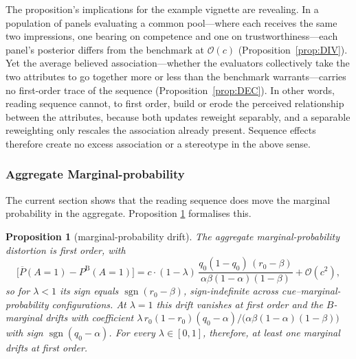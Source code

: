 \documentclass[a4paper,fleqn]{cas-sc}
\newtheorem{proposition}{Proposition}
\theoremstyle{remark}
\theoremstyle{definition}
\newcommand{\PB}{P^{\mathrm{B}}}
\newcommand{\Pbar}{\overline{P}}
\newcommand{\sgn}{\operatorname{sgn}}
\newcommand{\bigO}{\mathcal{O}}
\newcommand{\anchor}[1]{}
\begin{document}
The proposition's implications for the example vignette are revealing. In a population of panels evaluating a common pool---where each receives the same two impressions, one bearing on competence and one on trustworthiness---each panel's posterior differs from the benchmark at $\bigO(c)$
(Proposition~\ref{prop:DIV}). Yet the average believed association---whether the evaluators
collectively take the two attributes to go together more or less than the benchmark
warrants---carries no first-order trace of the sequence (Proposition~\ref{prop:DEC}). In other words, reading sequence cannot, to first order, build or erode the perceived relationship between the attributes,
because both updates reweight separably, and a separable reweighting only rescales the
association already present. Sequence effects therefore create no excess association or a stereotype in the above sense.

\subsubsection{Aggregate Marginal-probability}
\label{sec:marginal}

The current section shows that the reading sequence does move the marginal probability in the aggregate. Proposition \ref{prop:DRF} formalises this.

\renewcommand{\theproposition}{DRF}%
\begin{proposition}[marginal-probability drift]\label{prop:DRF}
The aggregate \emph{marginal-probability} distortion is first order, with
\[
  \big[\Pbar(A{=}1)-\PB(A{=}1)\big]
   = c\cdot(1-\lambda)\,\frac{q_0(1-q_0)\,(r_0-\beta)}{\alpha\beta(1-\alpha)(1-\beta)}+\bigO(c^2),
\]
so for $\lambda<1$ its sign equals $\sgn(r_0-\beta)$, sign-indefinite across
cue--marginal-probability configurations. At $\lambda=1$ this drift vanishes at first order and
the $B$-marginal drifts with coefficient
$\lambda\,r_0(1-r_0)(q_0-\alpha)/\big(\alpha\beta(1-\alpha)(1-\beta)\big)$ with sign
$\sgn(q_0-\alpha)$. For every $\lambda\in[0,1]$, therefore, at least one marginal drifts at first order.
\anchor{Prop.~DRF}
\end{proposition}
\end{document}
